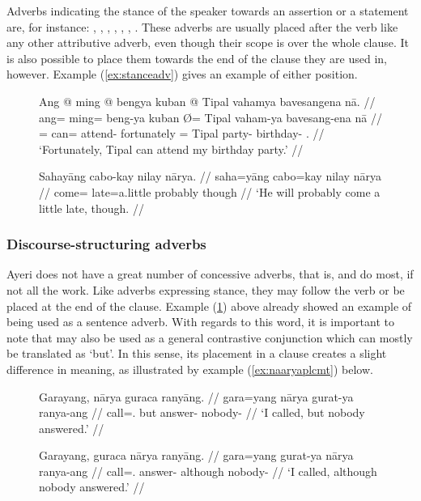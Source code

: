 Adverbs indicating the stance of the speaker towards an assertion or a 
statement are, for instance:
, 
,
,
,
,
,
.
These adverbs are usually placed after the verb like any other attributive 
adverb, even though their scope is over the whole clause. It is also possible 
to place them towards the end of the clause they are used in, however. Example 
(\ref{ex:stanceadv}) gives an example of either position.

\begin{figure}[h]
\pex\label{ex:stanceadv}
\a\begingl
	\gla Ang @ ming @ bengya kuban {} @ Tipal vahamya bavesangena nā. //
	\glb ang= ming= beng-ya kuban Ø= Tipal vaham-ya bavesang-ena nā //
	\glc \AgtT{}= can= attend-\TsgM{} fortunately \Top{}= Tipal party-\Loc{} 
		birthday-\Gen{} \Fsg{}.\Gen{} //
	\glft `Fortunately, Tipal can attend my birthday party.' //
\endgl

\a\label{ex:naaryaadv}\begingl
	\gla Sahayāng cabo-kay nilay nārya. //
	\glb saha=yāng cabo=kay nilay nārya //
	\glc come=\TsgM{} late=a.little probably though //
	\glft `He will probably come a little late, though. //
\endgl
\xe
\end{figure}

\subsubsection{Discourse-structuring adverbs}
\label{subsubsec:discourseadv}

Ayeri does not have a great number of concessive adverbs, that is,
 and  do most, if not all the work. Like adverbs expressing stance,
they may follow the verb or be placed at the end of the clause. Example
(\ref{ex:naaryaadv}) above already showed an example of 
being used as a sentence adverb. With regards to this word, it is important to
note that  may also be used as a general contrastive
conjunction which can mostly be translated as `but'. In this sense, its
placement in a clause creates a slight difference in meaning, as illustrated
by example (\ref{ex:naaryaplcmt}) below.

\begin{figure}[h]
\pex\label{ex:naaryaplcmt}
\a\label{ex:naaryaconj}\begingl
	\gla Garayang, nārya guraca ranyāng. //
	\glb gara=yang nārya gurat-ya ranya-ang //
	\glc call=\Fsg{}.\Aarg{} but answer-\TsgM{} nobody-\Aarg{} //
	\glft `I called, but nobody answered.' //
\endgl

\a\label{ex:naaryaadv2}\begingl
	\gla Garayang, guraca nārya ranyāng. //
	\glb gara=yang gurat-ya nārya ranya-ang //
	\glc call=\Fsg{}.\Aarg{} answer-\TsgM{} although nobody-\Aarg{} //
	\glft `I called, although nobody answered.' //
\endgl
\xe
\end{figure}

